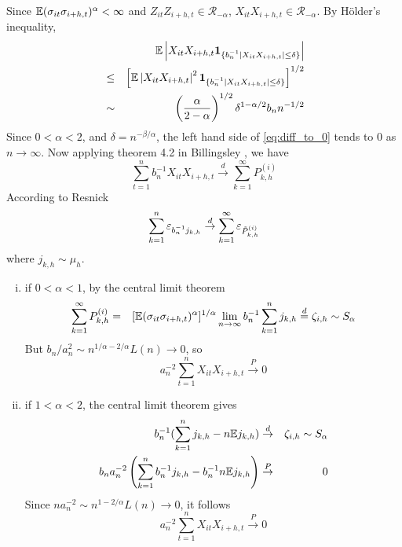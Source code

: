 \documentclass{article}
\begin{document}
Since $\mathbb{E}(\sigma_{it} \sigma_{i+h, t})^{\alpha} < \infty$ and
$Z_{it} Z_{i+h, t} \in \mathcal R_{-\alpha}$, $X_{it} X_{i+h,t} \in
\mathcal R_{-\alpha}$. By H\"older's inequality,
\begin{eqnarray*}
  && \mathbb{E} \left|X_{it} X_{i+h, t}\mathbf{1}_{\{b_n^{-1} |X_{it} X_{i+h, t} | \leq
      \delta\}} \right|  \\
  &\leq& \left [\mathbb{E} \left|X_{it} X_{i+h, t} \right|^2\mathbf{1}_{\{b_n^{-1} |X_{it} X_{i+h, t} | \leq
      \delta\}} \right]^{1/2}  \\
  &\sim& \left({\alpha \over 2 - \alpha}\right)^{1/2}  \delta^{1 -
    \alpha/2} b_n n^{-1/2}
\end{eqnarray*}
Since $0 < \alpha < 2$, and $\delta = n^{-\beta/\alpha}$, the left
hand side of \eqref{eq:diff_to_0} tends to 0 as $n \to \infty$. Now
applying theorem 4.2 in Billingsley \cite{billingsley1968convergence},
we have
\[
\sum_{t=1}^n b_n^{-1} X_{it} X_{i+h, t} \overset{d}{\to}
\sum_{k=1}^\infty P^{(i)}_{k,h}
\]
According to Resnick \cite{Resnick1986}
\[
\sum_{k=1}^n \varepsilon_{b_n^{-1} j_{k,h}} \overset{d}{\to}
\sum_{k=1}^\infty \varepsilon_{\tilde P^{(i)}_{k,h}}
\]
where $j_{k,h} \sim \mu_h$.
\begin{enumerate}[(i)]
\item if $0 < \alpha < 1$, by the central limit theorem
  \begin{eqnarray*}
    \sum_{k=1}^\infty P^{(i)}_{k,h} &=& [\mathbb{E}(\sigma_{it} \sigma_{i+h,
      t})^{\alpha}]^{1/\alpha} \lim_{n \to \infty}
    b_n^{-1}\sum_{k=1}^n j_{k,h} \overset{d}{=} \zeta_{i,h} \sim
    S_{\alpha}
  \end{eqnarray*}
  But $b_n/a_n^2 \sim n^{1/\alpha - 2/\alpha} L(n) \to 0$, so
  \[
  a_n^{-2} \sum_{t=1}^n X_{it} X_{i+h, t} \overset{P}{\to} 0
  \]

\item if $1 < \alpha < 2$, the central limit theorem gives
  \begin{eqnarray*}
    b_n^{-1} (\sum_{k=1}^n j_{k,h} - n \mathbb{E} j_{k,h}) &\overset{d}{\to}&
    \zeta_{i,h} \sim S_{\alpha} \\
    b_n a_n^{-2} \left(
      \sum_{k=1}^n b_n^{-1} j_{k,h} - b_n^{-1} n \mathbb{E} j_{k,h}
    \right) &\overset{P}{\to}& 0
  \end{eqnarray*}
  Since $n a_n^{-2} \sim n^{1 - 2/\alpha} L(n)\to 0$, it follows
  \[
  a_n^{-2} \sum_{t=1}^n X_{it} X_{i+h, t} \overset{P}{\to} 0
  \]
\end{enumerate}
\end{document}
